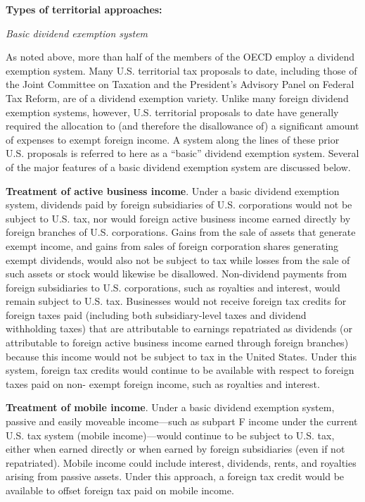 \begin{select}
\begin{center}
\textbf{Types of territorial approaches:} 
 
\emph{Basic dividend exemption system} 
\end{center}
 
As noted above, more than half of the members of the OECD employ a dividend 
exemption system.  Many U.S. territorial tax proposals to date, including those of the 
Joint Committee on Taxation and the President's Advisory Panel on Federal Tax Reform, 
are of a dividend exemption variety.  Unlike many foreign dividend exemption systems, 
however, U.S. territorial proposals to date have generally required the allocation to (and 
therefore the disallowance of) a significant amount of expenses to exempt foreign 
income.  A system along the lines of these prior U.S. proposals is referred to here as a 
``basic'' dividend exemption system.  Several of the major features of a basic dividend 
exemption system are discussed below. 
 
\textbf{Treatment of active business income}.  Under a basic dividend exemption system, 
dividends paid by foreign subsidiaries of U.S. corporations would not be subject to U.S. 
tax, nor would foreign active business income earned directly by foreign branches of U.S. 
corporations.  Gains from the sale of assets that generate exempt income, and gains from 
sales of foreign corporation shares generating exempt dividends, would also not be 
subject to tax while losses from the sale of such assets or stock would likewise be 
disallowed.  Non-dividend payments from foreign subsidiaries to U.S. corporations, such 
as royalties and interest, would remain subject to U.S. tax.  Businesses would not receive 
foreign tax credits for foreign taxes paid (including both subsidiary-level taxes and 
dividend withholding taxes) that are attributable to earnings repatriated as dividends (or 
attributable to foreign active business income earned through foreign branches) because 
this income would not be subject to tax in the United States.  Under this system, foreign 
tax credits would continue to be available with respect to foreign taxes paid on non- 
exempt foreign income, such as royalties and interest. 
 
\textbf{Treatment of mobile income}.  Under a basic dividend exemption system, passive and 
easily moveable income---such as subpart F income under the current U.S. tax system 
(mobile income)---would continue to be subject to U.S. tax, either when earned directly 
or when earned by foreign subsidiaries (even if not repatriated).  Mobile income could 
include interest, dividends, rents, and royalties arising from passive assets.  Under this 
approach, a foreign tax credit would be available to offset foreign tax paid on mobile 
income. 
   

\end{select}
